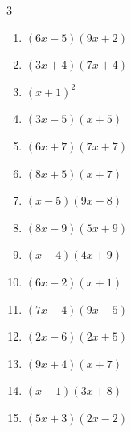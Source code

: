 \begin{multicols}{3}
\begin{enumerate}
  \item $(6x-5)(9x+2)$


  \item $(3x+4)(7x+4)$


  \item $(x+1)^{2}$


  \item $(3x-5)(x+5)$


  \item $(6x+7)(7x+7)$


  \item $(8x+5)(x+7)$


  \item $(x-5)(9x-8)$


  \item $(8x-9)(5x+9)$


  \item $(x-4)(4x+9)$


  \item $(6x-2)(x+1)$


  \item $(7x-4)(9x-5)$


  \item $(2x-6)(2x+5)$


\columnbreak %

  \item $(9x+4)(x+7)$


  \item $(x-1)(3x+8)$


  \item $(5x+3)(2x-2)$


\end{enumerate}
\end{multicols}
